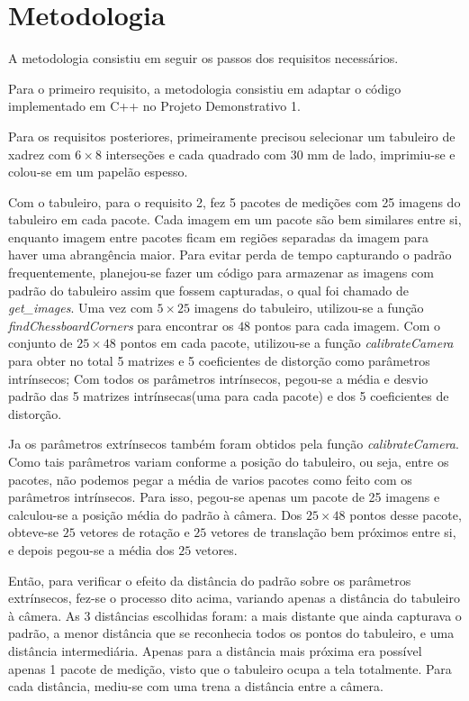 \section{Metodologia}
\label{metodologia}

A metodologia consistiu em seguir os passos dos requisitos necessários. 

Para o primeiro requisito, a metodologia consistiu em adaptar o código implementado em C++ no Projeto Demonstrativo 1.

Para os requisitos posteriores, primeiramente precisou selecionar um tabuleiro de xadrez com $6\times 8$ interseções e cada quadrado com $30$ mm de lado, imprimiu-se e colou-se em um papelão espesso.

Com o tabuleiro, para o requisito 2, fez 5 pacotes de medições com 25 imagens do tabuleiro em cada pacote. Cada imagem em um pacote são bem similares entre si, enquanto imagem entre pacotes ficam em regiões separadas da imagem para haver uma abrangência maior. Para evitar perda de tempo capturando o padrão frequentemente, planejou-se fazer um código para armazenar as imagens com padrão do tabuleiro assim que fossem capturadas, o qual foi chamado de \textit{get\_images}.
Uma vez com $5 \times 25$ imagens do tabuleiro, utilizou-se a função \textit{findChessboardCorners}\cite{CameraCalibration} para encontrar os $48$ pontos para cada imagem. Com o conjunto de $25 \times 48$ pontos em cada pacote, utilizou-se a função \textit{calibrateCamera}\cite{CameraCalibration} para obter no total 5 matrizes e 5 coeficientes de distorção como parâmetros intrínsecos; %
Com todos os parâmetros intrínsecos, pegou-se a média e desvio padrão das 5 matrizes intrínsecas(uma para cada pacote) e dos 5 coeficientes de distorção. 

Ja os parâmetros extrínsecos também foram obtidos pela função \textit{calibrateCamera}. Como tais parâmetros variam conforme a posição do tabuleiro, ou seja, entre os pacotes, não podemos pegar a média de varios pacotes como feito com os parâmetros intrínsecos. Para isso, pegou-se apenas um pacote de 25 imagens e calculou-se a posição média do padrão à câmera. Dos $25 \times 48$ pontos desse pacote, obteve-se $25$ vetores de rotação e $25$ vetores de translação bem próximos entre si, e depois pegou-se a média dos $25$ vetores.

Então, para verificar o efeito da distância do padrão sobre os parâmetros extrínsecos, fez-se o processo dito acima, variando apenas a distância do tabuleiro à câmera. As 3 distâncias escolhidas foram: a mais distante que ainda capturava o padrão, a menor distância que se reconhecia todos os pontos do tabuleiro, e uma distância intermediária. Apenas para a distância mais próxima era possível apenas 1 pacote de medição, visto que o tabuleiro ocupa a tela totalmente. Para cada distância, mediu-se com uma trena a distância entre a câmera.

